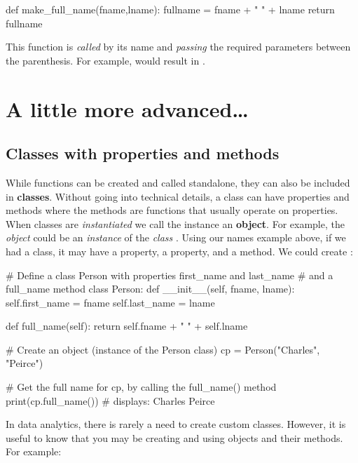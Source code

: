 \begin{pycode}
    def make_full_name(fname,lname):
        fullname =  fname + " " + lname
        return fullname
\end{pycode}

This function is \textit{called} by its name and \textit{passing} the required parameters between the parenthesis. For example,  would result in .

\section{A little more advanced\ldots}

\subsection{Classes with properties and methods}

While functions can be created and called standalone, they can also be included in \textbf{classes}. Without going into technical details, a class can have properties and methods where the methods are functions that usually operate on properties. When classes are \textit{instantiated} we call the instance an \textbf{object}. For example, the \textit{object}  could be an \textit{instance} of the \textit{class} . Using our names example above, if we had a  class, it may have a  property, a  property, and a  method. We could create :

\begin{pycode}
    # Define a class Person with properties first_name and last_name
    # and a full_name method
    class Person:
        def __init__(self, fname, lname):
            self.first_name = fname
            self.last_name = lname

        def full_name(self):
            return self.fname + " " + self.lname

    # Create an object (instance of the Person class)
    cp = Person("Charles", "Peirce")

    # Get the full name for cp, by calling the full_name() method
    print(cp.full_name()) # displays: Charles Peirce
\end{pycode}

In data analytics, there is rarely a need to create custom classes. However, it is useful to know that you may be creating and using objects and their methods. For example:


